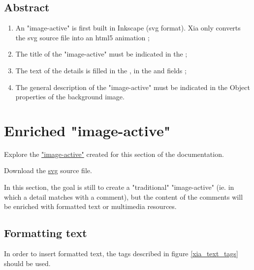 \subsection{Abstract}

\begin{enumerate}
 \item An "image-active" is first built in Inkscape (svg format). Xia only 
 converts the svg source file into an html5 animation ;
 \item The title of the "image-active" must be indicated in the  ;
 \item The text of the details is filled in the , 
 in the  and  fields ;
 \item The general description of the "image-active" must be indicated in the \chemin
{Object properties} of the background image.
\end{enumerate}

\section{Enriched "image-active"}\label{enriched_IA}

\begin{links}
Explore the \href{http://images-actives.crdp-versailles.fr/beta/demo/tuto/xia2}{"image-active"} created for this section of the documentation.

Download the \href{http://images-actives.crdp-versailles.fr/beta/demo/tuto/xia2/svg/xia2.svg}{svg} source file.
\end{links}

In this section, the goal is still to create a "traditional" "image-active" 
(ie. in which a detail matches with a comment), but the content of the comments 
will be enriched with  formatted text or multimedia resources.

\subsection{Formatting text}

In order to insert formatted text, the tags described in figure \ref{xia_text_tags} should be used.

